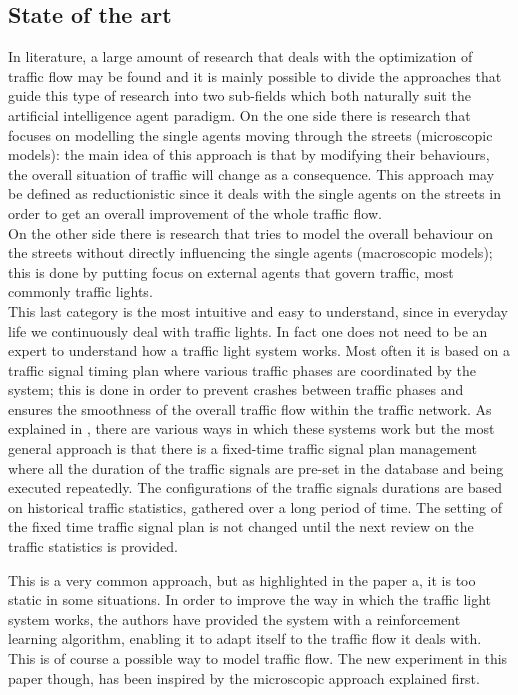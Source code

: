 \documentclass[a4paper,hidelinks]{article}
\begin{document}
\subsection{State of the art}
In literature, a large amount of research that deals with the optimization of traffic flow may be found and it is mainly possible to divide the approaches that guide this type of research into two sub-fields which both naturally suit the artificial intelligence agent paradigm. On the one side there is research that focuses on modelling the single agents moving through the streets (microscopic models): the main idea of this approach is that by modifying their behaviours, the overall situation of traffic will change as a consequence. This approach may be defined as reductionistic since it deals with the single agents on the streets in order to get an overall improvement of the whole traffic flow. \\
On the other side there is research that tries to model the overall behaviour on the streets without directly influencing the single agents (macroscopic models); this is done by putting focus on external agents that govern traffic, most commonly traffic lights. \\
This last category is the most intuitive and easy to understand, since in everyday life we continuously deal with traffic lights. In fact one does not need to be an expert to understand how a traffic light system works. Most often it is based on a traffic signal timing plan where various traffic phases are coordinated by the system; this is done in order to prevent crashes between traffic phases and ensures the smoothness of the overall traffic flow within the traffic network. As explained in \cite{chin2011q}, there are various ways in which these systems work but the most general approach is that there is a fixed-time traffic signal plan management where all the duration of the traffic signals are pre-set in the database and being executed repeatedly. The configurations of the traffic signals durations are based on historical traffic statistics, gathered over a long period of time. The setting of the fixed time traffic signal plan is not changed until the next review on the traffic statistics is provided.

This is a very common approach, but as highlighted in the paper a, it is too static in some situations. In order to improve the way in which the traffic light system works, the authors have provided the system with a reinforcement learning algorithm, enabling it to adapt itself to the traffic flow it deals with. This is of course a possible way to model traffic flow. The new experiment in this paper though, has been inspired by the microscopic approach explained first.
\end{document}
